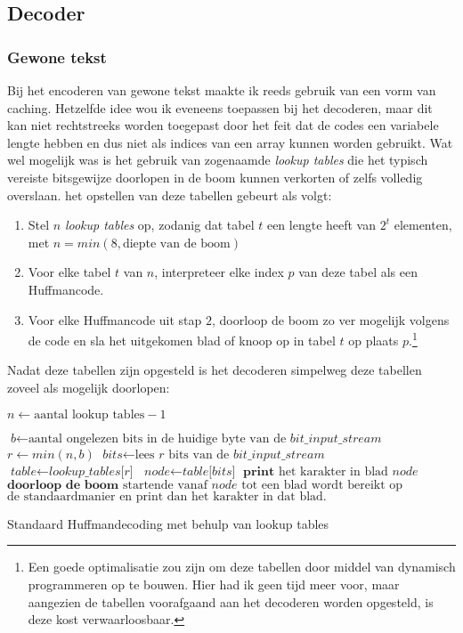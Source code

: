 \subsection{Decoder}

\subsubsection{Gewone tekst}
Bij het encoderen van gewone tekst maakte ik reeds gebruik van een vorm van caching. Hetzelfde idee wou ik eveneens toepassen bij het decoderen, maar dit kan niet rechtstreeks worden toegepast door het feit dat de codes een variabele lengte hebben en dus niet als indices van een array kunnen worden gebruikt. Wat wel mogelijk was is het gebruik van zogenaamde \emph{lookup tables} die het typisch vereiste bitsgewijze doorlopen in de boom kunnen verkorten of zelfs volledig overslaan. het opstellen van deze tabellen gebeurt als volgt:
\begin{enumerate}
	\item Stel $n$ \emph{lookup tables} op, zodanig dat tabel $t$ een lengte heeft van $2^t$ elementen, met $n = min(8, \text{diepte van de boom})$
	\item Voor elke tabel $t$ van $n$, interpreteer elke index $p$ van deze tabel als een Huffmancode.
	\item Voor elke Huffmancode uit stap $2$, doorloop de boom zo ver mogelijk volgens de code en sla het uitgekomen blad of knoop op in tabel $t$ op plaats $p$.\footnote{Een goede optimalisatie zou zijn om deze tabellen door middel van dynamisch programmeren op te bouwen. Hier had ik geen tijd meer voor, maar aangezien de tabellen voorafgaand aan het decoderen worden opgesteld, is deze kost verwaarloosbaar.}
\end{enumerate}
Nadat deze tabellen zijn opgesteld is het decoderen simpelweg deze tabellen zoveel als mogelijk doorlopen:
\begin{algorithm}
	\begin{algorithmic}[1]
		\State $\textit{n} \gets \text{aantal lookup tables} - 1$
		
		\State $\textit{b} \gets \text{aantal ongelezen bits in de huidige byte van de }\textit{bit\_input\_stream}$
		\State $\textit{r} \gets min(n, b)$
		\State $\textit{bits} \gets \text{lees }\textit{r}\text{ bits van de } \textit{bit\_input\_stream}$
		\State $\textit{table} \gets \textit{lookup\_tables[r]}$
		\State $\textit{node} \gets \textit{table[bits]}$
			\State $\textbf{print}\text{ het karakter in blad }\textit{node}$
		\Else
			\State $\textbf{doorloop de boom}\text{ startende vanaf }\textit{node}\text{ tot een blad wordt bereikt op}$
			\State $\text{de standaardmanier en print dan het karakter in dat blad.}$
		\EndIf
		\EndProcedure
	\end{algorithmic}
	\caption{Standaard Huffmandecoding met behulp van lookup tables}
\end{algorithm}


